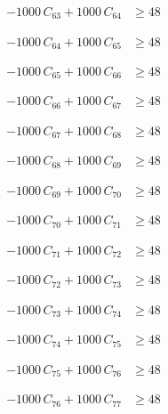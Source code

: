 \documentclass[a4paper,11pt]{article}
\begin{document}
\begin{align}
-1000\,C_{63} + 1000\,C_{64} &\geq 48 \nonumber
\end{align}

\begin{align}
-1000\,C_{64} + 1000\,C_{65} &\geq 48 \nonumber
\end{align}

\begin{align}
-1000\,C_{65} + 1000\,C_{66} &\geq 48 \nonumber
\end{align}

\begin{align}
-1000\,C_{66} + 1000\,C_{67} &\geq 48 \nonumber
\end{align}

\begin{align}
-1000\,C_{67} + 1000\,C_{68} &\geq 48 \nonumber
\end{align}

\begin{align}
-1000\,C_{68} + 1000\,C_{69} &\geq 48 \nonumber
\end{align}

\begin{align}
-1000\,C_{69} + 1000\,C_{70} &\geq 48 \nonumber
\end{align}

\begin{align}
-1000\,C_{70} + 1000\,C_{71} &\geq 48 \nonumber
\end{align}

\begin{align}
-1000\,C_{71} + 1000\,C_{72} &\geq 48 \nonumber
\end{align}

\begin{align}
-1000\,C_{72} + 1000\,C_{73} &\geq 48 \nonumber
\end{align}

\begin{align}
-1000\,C_{73} + 1000\,C_{74} &\geq 48 \nonumber
\end{align}

\begin{align}
-1000\,C_{74} + 1000\,C_{75} &\geq 48 \nonumber
\end{align}

\begin{align}
-1000\,C_{75} + 1000\,C_{76} &\geq 48 \nonumber
\end{align}

\begin{align}
-1000\,C_{76} + 1000\,C_{77} &\geq 48 \nonumber
\end{align}
\end{document}

